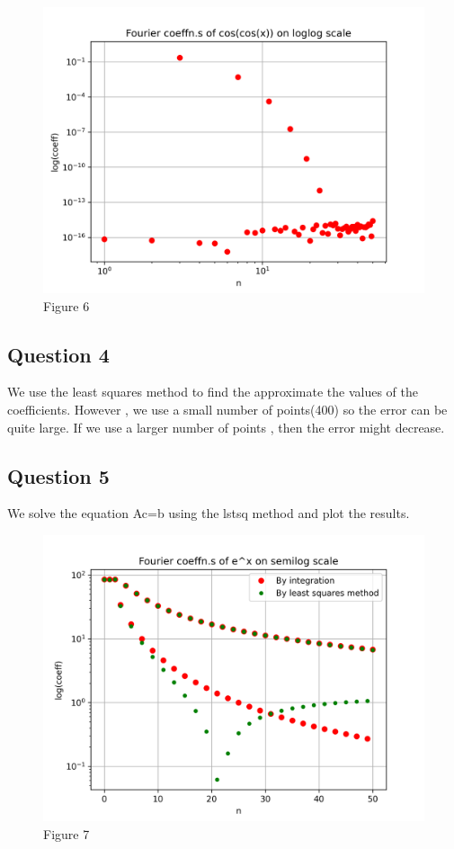 \documentclass[11pt, a4paper]{article}
\begin{document}
\begin{figure}[!tbh]
\centering
\includegraphics[scale=0.6]{assn4_plot6.png}
\caption{Figure 6}
\label{fig:plot6}
\end{figure} 

\subsection*{Question 4}
We use the least squares method to find the approximate the values of the coefficients. However , we use a small number of points(400) so the error can be quite large. If we use a larger number of points , then the error might decrease.

\subsection*{Question 5}
We solve the equation Ac=b using the lstsq method and plot the results.

\begin{figure}[!tbh]
\centering
\includegraphics[scale=0.6]{assn4_plot7.png}
\caption{Figure 7}
\label{fig:plot7}
\end{figure} 
\end{document}
